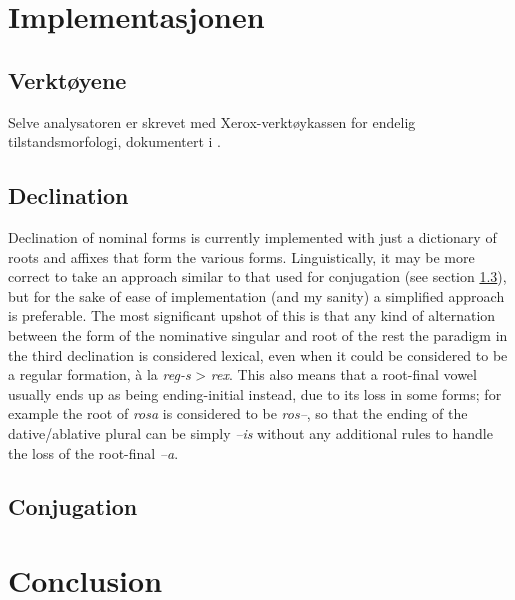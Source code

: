\documentclass{article}
\begin{document}
\section{Implementasjonen}
\subsection{Verkt\o{}yene}
Selve analysatoren er skrevet med Xerox-verkt\o{}ykassen for endelig
tilstandsmorfologi, dokumentert i .


\subsection{Declination}
Declination of nominal forms is currently implemented with just a dictionary
of roots and affixes that form the various forms. Linguistically, it may be
more correct to take an approach similar to that used for conjugation (see
section \ref{conjugation}), but for the sake of ease of implementation (and my
sanity) a simplified approach is preferable. The most significant upshot of
this is that any kind of alternation between the form of the nominative
singular and root of the rest the paradigm in the third declination is
considered lexical, even when it could be considered to be a regular
formation, \`a la \emph{reg-s} > \emph{rex}. This also means that a root-final
vowel usually ends up as being ending-initial instead, due to its loss in some
forms; for example the root of \emph{rosa} is considered to be \emph{ros--},
so that the ending of the dative/ablative plural can be simply \emph{--is}
without any additional rules to handle the loss of the root-final \emph{--a}.

\subsection{Conjugation}\label{conjugation}

\section{Conclusion} %

{}
\end{document}
